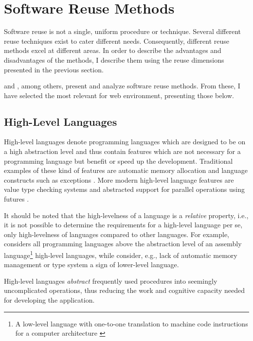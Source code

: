 \section{Software Reuse Methods}

Software reuse is not a single, uniform procedure or technique. Several different reuse techniques exist to cater different needs. Consequently, different reuse methods excel at different areas. In order to describe the advantages and disadvantages of the methods, I describe them using the reuse dimensions presented in the previous section.

\citet{krueger_software_1992} and \citet{sametinger_software_1997}, among others, present and analyze software reuse methods. From these, I have selected the most relevant for web environment, presenting those below.

\subsection{High-Level Languages}
High-level languages denote programming languages which are designed to be on a high abstraction level and thus contain features which are not necessary for a programming language but benefit or speed up the development. Traditional examples of these kind of features are automatic memory allocation \citep{krueger_software_1992} and language constructs such as exceptions \citep{mitchell_concepts_2003}. More modern high-level language features are value type checking systems and abstracted support for parallel operations using futures \citep{totoo_haskell_2012}. 

It should be noted that the high-levelness of a language is a \emph{relative} property, i.e., it is not possible to determine the requirements for a high-level language per se, only high-levelness of languages compared to other languages. For example, \citet{krueger_software_1992} considers all programming languages above the abstraction level of an assembly language\footnote{A low-level language with one-to-one translation to machine code instructions for a computer architecture \citep{salomon_assemblers_1993}} high-level languages, while \citet{carro_high-level_2006} consider, e.g., lack of automatic memory management or type system a sign of lower-level language.

High-level languages \emph{abstract} frequently used procedures into seemingly uncomplicated operations, thus reducing the work and cognitive capacity needed for developing the application. \citep[chap.~3]{krueger_software_1992}

